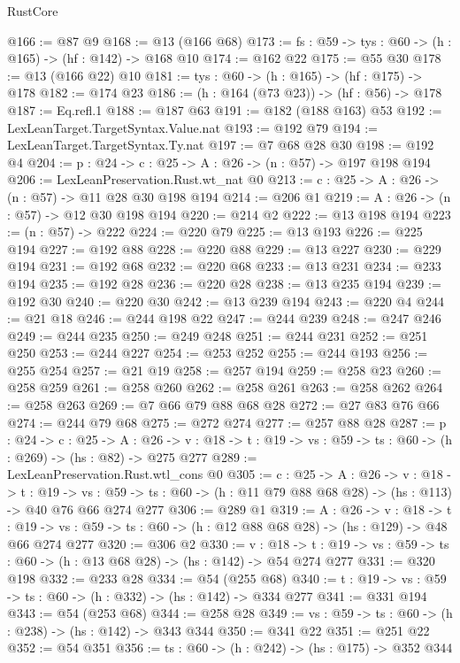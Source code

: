 \begin{lexlean}{RustCore}
\begin{coremodule}
@166 := @87 @9
@168 := @13 (@166 @68)
@173 := {fs : @59} -> {tys : @60} -> (h : @165) -> (hf : @142) -> @168 @10
@174 := @162 @22
@175 := @55 @30
@178 := @13 (@166 @22) @10
@181 := {tys : @60} -> (h : @165) -> (hf : @175) -> @178
@182 := @174 @23
@186 := (h : @164 (@73 @23)) -> (hf : @56) -> @178
@187 := Eq.refl.{1}
@188 := @187 @63
@191 := @182 (@188 @163) @53
@192 := LexLeanTarget.TargetSyntax.Value.nat
@193 := @192 @79
@194 := LexLeanTarget.TargetSyntax.Ty.nat
@197 := @7 @68 @28 @30
@198 := @192 @4
@204 := {p : @24} -> {c : @25} -> {A : @26} -> (n : @57) -> @197 @198 @194
@206 := LexLeanPreservation.Rust.wt_nat @0
@213 := {c : @25} -> {A : @26} -> (n : @57) -> @11 @28 @30 @198 @194
@214 := @206 @1
@219 := {A : @26} -> (n : @57) -> @12 @30 @198 @194
@220 := @214 @2
@222 := @13 @198 @194
@223 := (n : @57) -> @222
@224 := @220 @79
@225 := @13 @193
@226 := @225 @194
@227 := @192 @88
@228 := @220 @88
@229 := @13 @227
@230 := @229 @194
@231 := @192 @68
@232 := @220 @68
@233 := @13 @231
@234 := @233 @194
@235 := @192 @28
@236 := @220 @28
@238 := @13 @235 @194
@239 := @192 @30
@240 := @220 @30
@242 := @13 @239 @194
@243 := @220 @4
@244 := @21 @18
@246 := @244 @198 @22
@247 := @244 @239
@248 := @247 @246
@249 := @244 @235
@250 := @249 @248
@251 := @244 @231
@252 := @251 @250
@253 := @244 @227
@254 := @253 @252
@255 := @244 @193
@256 := @255 @254
@257 := @21 @19
@258 := @257 @194
@259 := @258 @23
@260 := @258 @259
@261 := @258 @260
@262 := @258 @261
@263 := @258 @262
@264 := @258 @263
@269 := @7 @66 @79 @88 @68 @28
@272 := @27 @83 @76 @66
@274 := @244 @79 @68
@275 := @272 @274
@277 := @257 @88 @28
@287 := {p : @24} ->
  {c : @25} ->
  {A : @26} ->
  {v : @18} -> {t : @19} -> {vs : @59} -> {ts : @60} -> (h : @269) -> (hs : @82) -> @275 @277
@289 := LexLeanPreservation.Rust.wtl_cons @0
@305 := {c : @25} ->
  {A : @26} ->
  {v : @18} ->
  {t : @19} ->
  {vs : @59} -> {ts : @60} -> (h : @11 @79 @88 @68 @28) -> (hs : @113) -> @40 @76 @66 @274 @277
@306 := @289 @1
@319 := {A : @26} ->
  {v : @18} ->
  {t : @19} -> {vs : @59} -> {ts : @60} -> (h : @12 @88 @68 @28) -> (hs : @129) -> @48 @66 @274 @277
@320 := @306 @2
@330 := {v : @18} ->
  {t : @19} -> {vs : @59} -> {ts : @60} -> (h : @13 @68 @28) -> (hs : @142) -> @54 @274 @277
@331 := @320 @198
@332 := @233 @28
@334 := @54 (@255 @68)
@340 := {t : @19} -> {vs : @59} -> {ts : @60} -> (h : @332) -> (hs : @142) -> @334 @277
@341 := @331 @194
@343 := @54 (@253 @68)
@344 := @258 @28
@349 := {vs : @59} -> {ts : @60} -> (h : @238) -> (hs : @142) -> @343 @344
@350 := @341 @22
@351 := @251 @22
@352 := @54 @351
@356 := {ts : @60} -> (h : @242) -> (hs : @175) -> @352 @344

\end{coremodule}
\end{lexlean}
